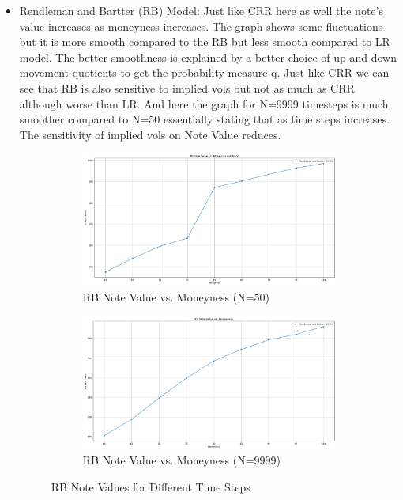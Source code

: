 \documentclass[12pt,a4paper]{article}
\begin{document}
\begin{itemize}
\clearpage  %

\item  Rendleman and Bartter (RB) Model:
Just like CRR here as well the note's value increases as moneyness increases. The graph shows some fluctuations but it is more smooth compared to the RB but less smooth compared to LR model. The better smoothness is explained by a better choice of up and down movement quotients to get the probability measure q.  Just like CRR we can see that RB is also sensitive to implied vols but not as much as CRR although worse than LR. And here the graph for N=9999 timesteps is much smoother compared to N=50 essentially stating that as time steps increases. The sensitivity of implied vols on Note Value reduces.
\begin{figure}[htbp]
    \centering
    \begin{subfigure}[b]{0.48\textwidth}
        \centering
        \includegraphics[width=\textwidth]{Images/sen_rb_50.png}
        \caption{RB Note Value vs. Moneyness (N=50)}
        \label{fig:crr_n50}
    \end{subfigure}
    \hfill
    \begin{subfigure}[b]{0.48\textwidth}
        \centering
        \includegraphics[width=\textwidth]{Images/sen_rb.png}
        \caption{RB Note Value vs. Moneyness (N=9999)}
        \label{fig:crr_n9999}
    \end{subfigure}
    \caption{RB Note Values for Different Time Steps}
    \label{fig:crr_comparison}
\end{figure}



\end{itemize}
\end{document}

